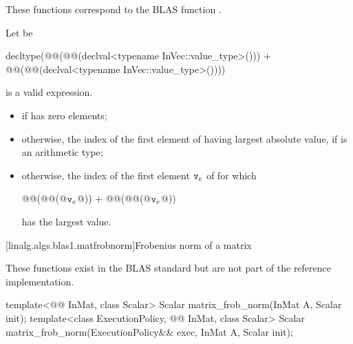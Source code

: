 \begin{itemdescr}
\pnum
\begin{note}
These functions correspond to the BLAS function .
\end{note}

\pnum
Let  be
\begin{codeblock}
decltype(@@(@@(declval<typename InVec::value_type>())) +
         @@(@@(declval<typename InVec::value_type>())))
\end{codeblock}

\pnum
\mandates
{} is a valid expression.

\pnum
\returns
\begin{itemize}
\item
{}
      if  has zero elements;
\item
otherwise, the index of the first element of 
having largest absolute value,
if  is an arithmetic type;
\item
otherwise, the index of the first element $\texttt{\protect v}_e$ of 
for which
\begin{codeblock}
@@(@@(@$\texttt{\protect v}_e$@)) + @@(@@(@$\texttt{\protect v}_e$@))
\end{codeblock}
has the largest value.
\end{itemize}
\end{itemdescr}

[linalg.algs.blas1.matfrobnorm]{Frobenius norm of a matrix}

\pnum
\begin{note}
These functions exist in the BLAS standard but are not part of the reference implementation.
\end{note}
\begin{itemdecl}
template<@@ InMat, class Scalar>
  Scalar matrix_frob_norm(InMat A, Scalar init);
template<class ExecutionPolicy, @@ InMat, class Scalar>
  Scalar matrix_frob_norm(ExecutionPolicy&& exec, InMat A, Scalar init);
\end{itemdecl}

